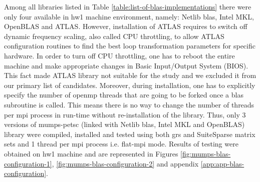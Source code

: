 Among all libraries listed in Table \ref{table:list-of-blas-implementations} there were only four available in \gls{hw1} machine environment, namely: Netlib \acrshort{blas}, Intel MKL, OpenBLAS and ATLAS. However, installation of ATLAS requires to switch off dynamic frequency scaling, also called CPU throttling, to allow ATLAS configuration routines to find the best loop transformation parameters for specific hardware. In order to turn off CPU throttling, one has to reboot the entire machine and make appropriate changes in Basic Input/Output System (BIOS). This fact made ATLAS library not suitable for the study and we excluded it from our primary list of candidates. Moreover, during installation, one has to explicitly specify the number of \acrshort{openmp} threads that are going to be forked once a \acrshort{blas} subroutine is called. This means there is no way to change the number of threads per \acrshort{mpi} process in run-time without re-installation of the library. Thus, only 3 versions of \acrshort{mumps}-\acrshort{petsc} (linked with Netlib \acrshort{blas}, Intel MKL and OpenBLAS) library were compiled, installed and tested using both \acrshort{grs} and SuiteSparse matrix sets and 1 thread per \acrshort{mpi} process i.e. flat-\acrshort{mpi} mode. Results of testing were obtained on \gls{hw1} machine and are represented in Figures \ref{fig:mumps-blas-configuration-1}, \ref{fig:mumps-blas-configuration-2} and appendix \ref{app:app-blas-configuration}.\\


